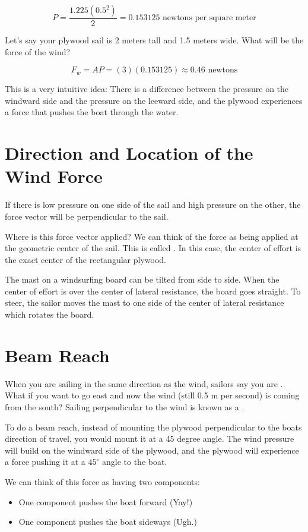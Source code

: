 $$P =  \frac{1.225 (0.5^2)}{2} =  0.153125 \text{ newtons per square meter}$$

Let's say your plywood sail is 2 meters tall and 1.5 meters wide.  What will be the force of the wind?

$$F_w  = A P = (3)(0.153125) \approx 0.46 \text{ newtons}$$

This is a very intuitive idea:  There is a difference between the pressure on the windward side and the pressure on the leeward side,  and the plywood experiences a force that pushes
the boat through the water.

\section{Direction and Location of the Wind Force}

If there is low pressure on one side of the sail and high pressure on the other,  the force vector will be perpendicular to the sail. 
 
Where is this force vector applied?  We can think of the force as being applied at the geometric center of the sail.  This is called .   In this case,  the center of effort is the exact center of the rectangular plywood.

The mast on a windsurfing board can be tilted from side to side.  When the center of effort is over the center of lateral resistance,  the board goes straight.
To steer,   the sailor moves the mast to one side of the center of lateral resistance which rotates the board.

\section{Beam Reach}

When you are sailing in the same direction as the wind,  sailors say you are .   What if you want to go east and now the wind (still 0.5 m per second) is coming from the south?  Sailing perpendicular to the wind is known as a .

To do a beam reach,  instead of mounting the plywood perpendicular to the boats direction of travel,  you would mount it at a 45 degree angle.   The wind pressure will build on the windward
side of the plywood,  and the plywood will experience a force pushing it at a $45^\circ$ angle to the boat.

We can think of this force as having two components: 
\begin{itemize}
\item One component pushes the boat forward (Yay!)
\item One component pushes the boat sideways (Ugh.)
\end{itemize}

